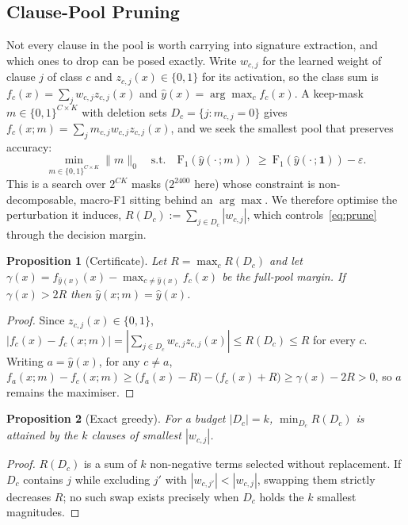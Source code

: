 \documentclass[conference]{IEEEtran}
\newtheorem{proposition}{Proposition}
\begin{document}
\subsection{Clause-Pool Pruning}
\label{sec:prune}
Not every clause in the pool is worth carrying into signature extraction,
and which ones to drop can be posed exactly. Write $w_{c,j}$ for the
learned weight of clause $j$ of class $c$ and $z_{c,j}(x) \in \{0,1\}$ for
its activation, so the class sum is $f_c(x)=\sum_j w_{c,j} z_{c,j}(x)$ and
$\hat{y}(x)=\arg\max_c f_c(x)$. A keep-mask
$m \in \{0,1\}^{C \times K}$ with deletion sets $D_c=\{j: m_{c,j}=0\}$
gives $f_c(x;m)=\sum_j m_{c,j} w_{c,j} z_{c,j}(x)$, and we seek the
smallest pool that preserves accuracy:
\begin{equation}
\min_{m \in \{0,1\}^{C \times K}} \lVert m \rVert_0
\quad\text{s.t.}\quad
\mathrm{F_1}\!\left(\hat{y}(\cdot\,;m)\right) \ \ge\
\mathrm{F_1}\!\left(\hat{y}(\cdot\,;\mathbf{1})\right) - \varepsilon .
\label{eq:prune}
\end{equation}
This is a search over $2^{CK}$ masks ($2^{2400}$ here) whose constraint is
non-decomposable, macro-F1 sitting behind an $\arg\max$. We therefore
optimise the perturbation it induces,
$R(D_c) := \sum_{j \in D_c} |w_{c,j}|$, which controls~\eqref{eq:prune} through the
decision margin.

\begin{proposition}[Certificate]
\label{prop:cert}
Let $R = \max_c R(D_c)$ and let
$\gamma(x)=f_{\hat{y}(x)}(x)-\max_{c \neq \hat{y}(x)} f_c(x)$ be the
full-pool margin. If $\gamma(x) > 2R$ then $\hat{y}(x;m)=\hat{y}(x)$.
\end{proposition}
\begin{proof}
Since $z_{c,j}(x) \in \{0,1\}$,
$|f_c(x)-f_c(x;m)| = |\sum_{j \in D_c} w_{c,j} z_{c,j}(x)| \le R(D_c) \le R$
for every $c$. Writing $a=\hat{y}(x)$, for any $c \neq a$,
$f_a(x;m)-f_c(x;m) \ge \bigl(f_a(x)-R\bigr)-\bigl(f_c(x)+R\bigr)
\ge \gamma(x)-2R > 0$, so $a$ remains the maximiser.
\end{proof}

\begin{proposition}[Exact greedy]
\label{prop:greedy}
For a budget $|D_c| = k$, $\min_{D_c} R(D_c)$ is attained by the $k$
clauses of smallest $|w_{c,j}|$.
\end{proposition}
\begin{proof}
$R(D_c)$ is a sum of $k$ non-negative terms selected without replacement.
If $D_c$ contains $j$ while excluding $j'$ with $|w_{c,j'}| < |w_{c,j}|$,
swapping them strictly decreases $R$; no such swap exists precisely when
$D_c$ holds the $k$ smallest magnitudes.
\end{proof}
\end{document}
